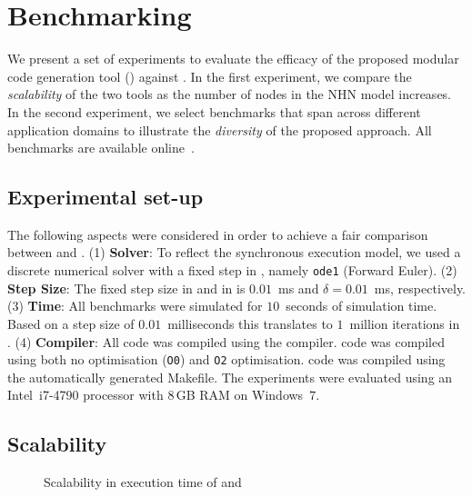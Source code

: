 \section{Benchmarking}
\label{sec:benchmarking}

We present a set of experiments to evaluate the efficacy of the proposed
modular code generation tool (\ourTool) against \simulink.  In the first 
experiment, we compare the \emph{scalability} of the two tools as the 
number of nodes in the \ac{NHN} model increases.  In the second experiment, we 
select benchmarks that span across different application domains 
to illustrate the \emph{diversity} 
of the proposed approach.  All benchmarks are 
available online~\cite{DATEBenchmarks}.


\subsection{Experimental set-up}
\label{sec:experimentalSetUp}
The following aspects were considered in order to achieve a fair
comparison between \ourTool and \simulink. 
(1) \textbf{Solver}: To reflect the synchronous execution model, we
  used a discrete numerical solver with a fixed step in \simulink,
  namely \texttt{ode1} (Forward Euler).
(2) 
\textbf{Step Size}: The fixed step size in \simulink and in \ourTool
  is  $0.01$~ms and $\delta = 0.01$~ms, respectively.
(3) 
\textbf{Time}: All benchmarks were simulated for $10$~seconds of
  simulation time.  Based on a step size of $0.01$~milliseconds this
  translates to $1$~million iterations in \ourTool.
  (4)
\textbf{Compiler}: All code was compiled using the \compiler
  compiler.  \ourTool code was compiled using both no optimisation
  (\texttt{O0}) and \texttt{O2} optimisation.  \simulink code was
  compiled using the automatically generated Makefile.
The experiments were evaluated using an Intel~i7-4790 processor with
$8$\,GB RAM on Windows~$7$.



\subsection{Scalability}
\vspace{-0.5cm}
\begin{figure}[htbp]
  \centering
  
  \setlength{\abovecaptionskip}{-10pt}
  \caption{Scalability in  execution time of \simulink and 
  \ourTool %
  }
  \label{fig:scalability}
  \vspace{-0.3cm}
\end{figure}


